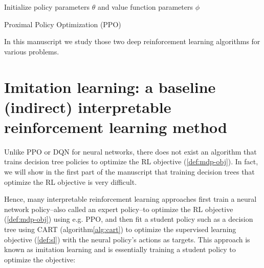 \begin{algorithm}
    Initialize policy parameters $\theta$ and value function parameters $\phi$ \\
    \caption{Proximal Policy Optimization (PPO)}\label{alg:ppo}
\end{algorithm}
In this manuscript we study those two deep reinforcement learning algorithms for various problems.

\section{Imitation learning: a baseline (indirect) interpretable reinforcement learning method}\label{sec:imit}

Unlike PPO or DQN for neural networks, there does not exist an algorithm that trains decision tree policies to optimize the RL objective (\ref{def:mdp-obj}).
In fact, we will show in the first part of the manuscript that training decision trees that optimize the RL objective is very difficult.

Hence, many interpretable reinforcement learning approaches first train a neural network policy--also called an expert policy--to optimize the RL objective (\ref{def:mdp-obj}) using e.g. PPO, and then fit a student policy such as a decision tree using CART (algorithm\ref{alg:cart}) to optimize the supervised learning objective (\ref{def:sl}) with the neural policy's actions as targets.
This approach is known as imitation learning and is essentially training a student policy to optimize the objective:

